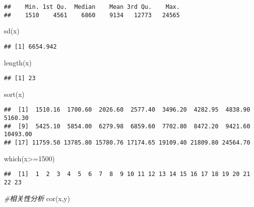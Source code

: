 \documentclass[
]{article}
\newenvironment{Shaded}{\begin{snugshade}}{\end{snugshade}}
\newcommand{\CommentTok}[1]{\textcolor[rgb]{0.56,0.35,0.01}{\textit{#1}}}
\newcommand{\DecValTok}[1]{\textcolor[rgb]{0.00,0.00,0.81}{#1}}
\newcommand{\FunctionTok}[1]{\textcolor[rgb]{0.00,0.00,0.00}{#1}}
\newcommand{\NormalTok}[1]{#1}
\newcommand{\SpecialCharTok}[1]{\textcolor[rgb]{0.00,0.00,0.00}{#1}}
\begin{document}
\begin{verbatim}
##    Min. 1st Qu.  Median    Mean 3rd Qu.    Max. 
##    1510    4561    6860    9134   12773   24565
\end{verbatim}

\begin{Shaded}
\begin{Highlighting}[]
\FunctionTok{sd}\NormalTok{(x)}
\end{Highlighting}
\end{Shaded}

\begin{verbatim}
## [1] 6654.942
\end{verbatim}

\begin{Shaded}
\begin{Highlighting}[]
\FunctionTok{length}\NormalTok{(x)}
\end{Highlighting}
\end{Shaded}

\begin{verbatim}
## [1] 23
\end{verbatim}

\begin{Shaded}
\begin{Highlighting}[]
\FunctionTok{sort}\NormalTok{(x)}
\end{Highlighting}
\end{Shaded}

\begin{verbatim}
##  [1]  1510.16  1700.60  2026.60  2577.40  3496.20  4282.95  4838.90  5160.30
##  [9]  5425.10  5854.00  6279.98  6859.60  7702.80  8472.20  9421.60 10493.00
## [17] 11759.50 13785.80 15780.76 17174.65 19109.40 21809.80 24564.70
\end{verbatim}

\begin{Shaded}
\begin{Highlighting}[]
\FunctionTok{which}\NormalTok{(x}\SpecialCharTok{\textgreater{}=}\DecValTok{1500}\NormalTok{)}
\end{Highlighting}
\end{Shaded}

\begin{verbatim}
##  [1]  1  2  3  4  5  6  7  8  9 10 11 12 13 14 15 16 17 18 19 20 21 22 23
\end{verbatim}

\begin{Shaded}
\begin{Highlighting}[]
\CommentTok{\#相关性分析}
\FunctionTok{cor}\NormalTok{(x,y)}
\end{Highlighting}
\end{Shaded}
\end{document}
